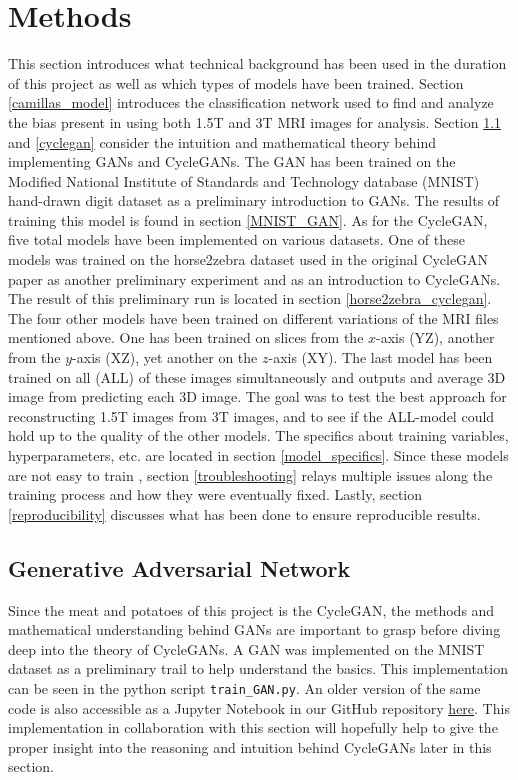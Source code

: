 \documentclass[11pt, fleqn, titlepage]{article}
\newcommand{\1}[1]{\mathds{1}\left[#1\right]}
\begin{document}
\section{Methods}
This section introduces what technical background has been used in the duration of this project as well as which types of models have been trained. Section \ref{camillas_model} introduces the classification network used to find and analyze the bias present in using both 1.5T and 3T MRI images for analysis. Section \ref{gan} and \ref{cyclegan} consider the intuition and mathematical theory behind implementing GANs and CycleGANs. The GAN has been trained on the Modified National Institute of Standards and Technology database (MNIST) hand-drawn digit dataset as a preliminary introduction to GANs. The results of training this model is found in section \ref{MNIST_GAN}. As for the CycleGAN, five total models have been implemented on various datasets. One of these models was trained on the horse2zebra dataset used in the original CycleGAN paper \cite{original_cyclegan} as another preliminary experiment and as an introduction to CycleGANs. The result of this preliminary run is located in section \ref{horse2zebra_cyclegan}. The four other models have been trained on different variations of the MRI files mentioned above. One has been trained on slices from the $x$-axis (YZ), another from the $y$-axis (XZ), yet another on the $z$-axis (XY). The last model has been trained on all (ALL) of these images simultaneously and outputs and average 3D image from predicting each 3D image. The goal was to test the best approach for reconstructing 1.5T images from 3T images, and to see if the ALL-model could hold up to the quality of the other models. The specifics about training variables, hyperparameters, etc. are located in section \ref{model_specifics}. Since these models are not easy to train \cite{hard_to_train}, section \ref{troubleshooting} relays multiple issues along the training process and how they were eventually fixed. Lastly, section \ref{reproducibility} discusses what has been done to ensure reproducible results. %



\subsection{Generative Adversarial Network}\label{gan}
Since the meat and potatoes of this project is the CycleGAN, the methods and mathematical understanding behind GANs are important to grasp before diving deep into the theory of CycleGANs. A GAN was implemented on the MNIST dataset as a preliminary trail to help understand the basics. This implementation can be seen in the python script \texttt{train\_GAN.py}. An older version of the same code is also accessible as a Jupyter Notebook in our GitHub repository  \href{https://github.com/oskarwiese/AlzPred/blob/main/preliminary/GAN_MNIST.ipynb}{here}. This implementation in collaboration with this section will hopefully help to give the proper insight into the reasoning and intuition behind CycleGANs later in this section.
\end{document}
